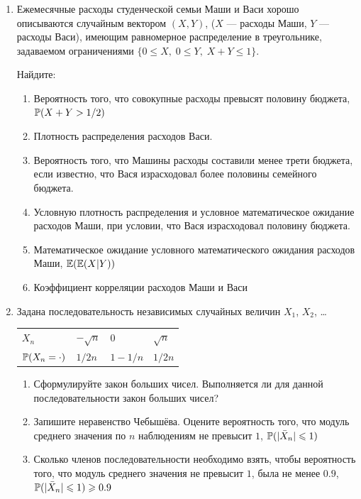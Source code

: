 \documentclass[12pt, a4paper]{article}\usepackage[]{graphicx}\usepackage[]{color}
\begin{document}
\begin{enumerate}
\item Ежемесячные расходы студенческой семьи Маши и Васи хорошо описываются случайным
вектором $(X,Y)$, ($X$ — расходы Маши, $Y$ — расходы Васи), имеющим равномерное
распределение в треугольнике, задаваемом ограничениями $\{0 \leq X, \; 0\leq Y, \; X+Y \leq 1 \}$.

Найдите:

\begin{enumerate}
\item Вероятность того, что совокупные расходы превысят половину бюджета, $\P(X+Y>1/2)$
\item Плотность распределения расходов Васи.
\item Вероятность того, что Машины расходы составили менее трети бюджета, если
известно, что Вася израсходовал более половины семейного бюджета.
\item Условную плотность распределения и условное математическое ожидание расходов Маши, при условии, что Вася израсходовал половину бюджета.
\item Математическое ожидание условного математического ожидания расходов Маши, $\E(\E(X|Y))$
\item Коэффициент корреляции расходов Маши и Васи
\end{enumerate}

\item Задана последовательность независимых случайных величин $X_1$, $X_2$, \ldots

\begin{tabular}{llll}
\toprule
$X_n$ & $-\sqrt{n}$ & $0$ & $\sqrt{n}$ \\
$\P(X_n = \cdot)$ & $1/2n$ & $1-1/n$ & $1/2n$ \\
\bottomrule
\end{tabular}

\begin{enumerate}
\item Сформулируйте закон больших чисел. Выполняется ли для данной последовательности
закон больших чисел?
\item Запишите неравенство Чебышёва. Оцените вероятность того, что модуль среднего
значения по $n$ наблюдениям не превысит $1$, $\P(|\bar X_n| \leq 1)$
\item Сколько членов последовательности необходимо взять, чтобы вероятность того, что
модуль среднего значения не превысит $1$, была не менее $0.9$, $\P(|\bar X_n| \leq 1)\geq 0.9$
\end{enumerate}


\end{enumerate}
\end{document}
